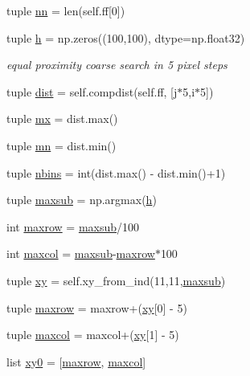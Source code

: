\begin{DoxyCompactItemize}
\item 
tuple \hyperlink{classmy_detector_1_1my_detector_a386c22e4c8877c163e1c1855ac602d08}{nn} = len(self.\-ff\mbox{[}0\mbox{]})
\item 
tuple \hyperlink{classmy_detector_1_1my_detector_afcb68bb2db834b6bb8c53cb194cf92bf}{h} = np.\-zeros((100,100), dtype=np.\-float32)
\begin{DoxyCompactList}\small\item\em equal proximity coarse search in 5 pixel steps \end{DoxyCompactList}\item 
tuple \hyperlink{classmy_detector_1_1my_detector_a043b9a79c751351b6d34bcf8f0d415ca}{dist} = self.\-compdist(self.\-ff, \mbox{[}j$\ast$5,i$\ast$5\mbox{]})
\item 
tuple \hyperlink{classmy_detector_1_1my_detector_a7527caeb614bc6fe04eeb93654826835}{mx} = dist.\-max()
\item 
tuple \hyperlink{classmy_detector_1_1my_detector_a9b4d1ba192592e66b106294a29e570fa}{mn} = dist.\-min()
\item 
tuple \hyperlink{classmy_detector_1_1my_detector_ab1ca2803f8b16b976504a260af1ec86b}{nbins} = int(dist.\-max() -\/ dist.\-min()+1)
\item 
tuple \hyperlink{classmy_detector_1_1my_detector_a751d25cb37c9899a46a52dab5f032ddd}{maxsub} = np.\-argmax(\hyperlink{classmy_detector_1_1my_detector_afcb68bb2db834b6bb8c53cb194cf92bf}{h})
\item 
int \hyperlink{classmy_detector_1_1my_detector_a12a6741173b6bd3474e420c671d191e7}{maxrow} = \hyperlink{classmy_detector_1_1my_detector_a751d25cb37c9899a46a52dab5f032ddd}{maxsub}/100
\item 
int \hyperlink{classmy_detector_1_1my_detector_afc1018938cfcc881d1bf17950b2dece6}{maxcol} = \hyperlink{classmy_detector_1_1my_detector_a751d25cb37c9899a46a52dab5f032ddd}{maxsub}-\/\hyperlink{classmy_detector_1_1my_detector_a12a6741173b6bd3474e420c671d191e7}{maxrow}$\ast$100
\item 
tuple \hyperlink{classmy_detector_1_1my_detector_aeb28c7375533c3ec81727b7176f116ed}{xy} = self.\-xy\-\_\-from\-\_\-ind(11,11,\hyperlink{classmy_detector_1_1my_detector_a751d25cb37c9899a46a52dab5f032ddd}{maxsub})
\item 
tuple \hyperlink{classmy_detector_1_1my_detector_a6a2f55541520bde064608b1a3c5aec7a}{maxrow} = maxrow+(\hyperlink{classmy_detector_1_1my_detector_aeb28c7375533c3ec81727b7176f116ed}{xy}\mbox{[}0\mbox{]} -\/ 5)
\item 
tuple \hyperlink{classmy_detector_1_1my_detector_a96cedce1e5c66aaeae9d1d8267e74e0c}{maxcol} = maxcol+(\hyperlink{classmy_detector_1_1my_detector_aeb28c7375533c3ec81727b7176f116ed}{xy}\mbox{[}1\mbox{]} -\/ 5)
\item 
list \hyperlink{classmy_detector_1_1my_detector_ac41c95e8050c844f716b64f39fdc65fc}{xy0} = \mbox{[}\hyperlink{classmy_detector_1_1my_detector_a12a6741173b6bd3474e420c671d191e7}{maxrow}, \hyperlink{classmy_detector_1_1my_detector_afc1018938cfcc881d1bf17950b2dece6}{maxcol}\mbox{]}
\end{DoxyCompactItemize}


